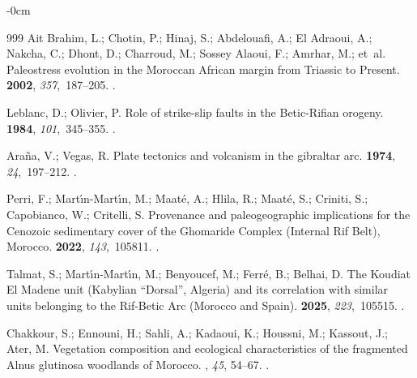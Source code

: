 \documentclass[geomatics,article,accept,pdftex,oneauthor]{Definitions/mdpi}
\begin{document}
\begin{adjustwidth}{-\extralength}{0cm}
\begin{thebibliography}{999}
{Ait Brahim}, L.; Chotin, P.; Hinaj, S.; Abdelouafi, A.; {El Adraoui}, A.;
  Nakcha, C.; Dhont, D.; Charroud, M.; {Sossey Alaoui}, F.; Amrhar, M.;  et~al.
\newblock Paleostress evolution in the Moroccan African margin from Triassic to
  Present.
 {\bf 2002}, {\em 357},~187--205.
.

Leblanc, D.; Olivier, P.
\newblock Role of strike-slip faults in the Betic-Rifian orogeny.
 {\bf 1984}, {\em 101},~345--355.
.

Ara{\~n}a, V.; Vegas, R.
\newblock Plate tectonics and volcanism in the gibraltar arc.
 {\bf 1974}, {\em 24},~197--212.
.

Perri, F.; Mart{\'\i}n-Mart{\'\i}n, M.; Maat{\'e}, A.; Hlila, R.; Maat{\'e},
  S.; Criniti, S.; Capobianco, W.; Critelli, S.
\newblock Provenance and paleogeographic implications for the Cenozoic
  sedimentary cover of the Ghomaride Complex (Internal Rif Belt), Morocco.
 {\bf 2022}, {\em 143},~105811.
.

Talmat, S.; Mart{\'\i}n-Mart{\'\i}n, M.; Benyoucef, M.; Ferr{\'e}, B.; Belhai,
  D.
\newblock The Koudiat El Madene unit (Kabylian ``Dorsal'', Algeria) and its
  correlation with similar units belonging to the Rif-Betic Arc (Morocco and
  Spain).
 {\bf 2025}, {\em
  223},~105515.
.

Chakkour, S.; Ennouni, H.; Sahli, A.; Kadaoui, K.; Houssni, M.; Kassout, J.;
  Ater, M.
\newblock Vegetation composition and ecological characteristics of the
  fragmented Alnus glutinosa woodlands of Morocco.
, \emph{45}, 54--67.
.


\end{thebibliography}
\end{adjustwidth}
\end{document}
